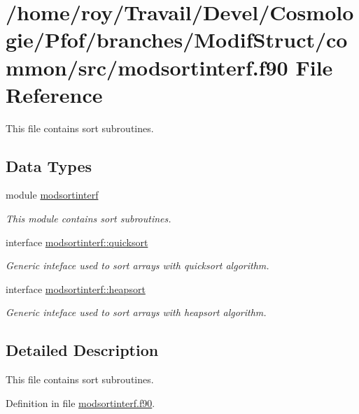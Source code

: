 \hypertarget{modsortinterf_8f90}{\section{/home/roy/\-Travail/\-Devel/\-Cosmologie/\-Pfof/branches/\-Modif\-Struct/common/src/modsortinterf.f90 File Reference}
\label{modsortinterf_8f90}
}


This file contains sort subroutines.  


\subsection*{Data Types}
\begin{DoxyCompactItemize}
\item 
module \hyperlink{classmodsortinterf}{modsortinterf}
\begin{DoxyCompactList}\small\item\em This module contains sort subroutines. \end{DoxyCompactList}\item 
interface \hyperlink{interfacemodsortinterf_1_1quicksort}{modsortinterf\-::quicksort}
\begin{DoxyCompactList}\small\item\em Generic inteface used to sort arrays with quicksort algorithm. \end{DoxyCompactList}\item 
interface \hyperlink{interfacemodsortinterf_1_1heapsort}{modsortinterf\-::heapsort}
\begin{DoxyCompactList}\small\item\em Generic inteface used to sort arrays with heapsort algorithm. \end{DoxyCompactList}\end{DoxyCompactItemize}


\subsection{Detailed Description}
This file contains sort subroutines. 

Definition in file \hyperlink{modsortinterf_8f90_source}{modsortinterf.\-f90}.

